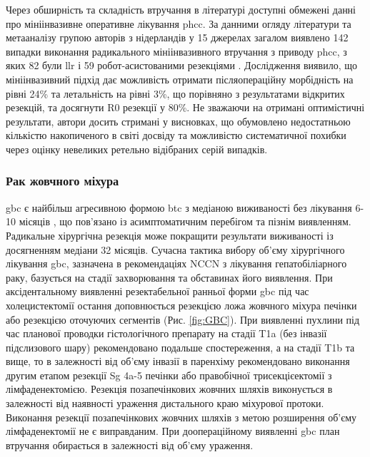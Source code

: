 \begin{refsection}
Через обширність та складність втручання в літературі доступні обмежені данні про мініінвазивне оперативне лікування \acrshort{phcc}. За данними огляду літератури та метааналізу групою авторів з нідерландів у 15 джерелах загалом виявлено 142 випадки виконання радикального мініінвазивного втручання з приводу \acrshort{phcc}, з яких 82 були \acrshort{llr} і 59 робот-асистованими резекціями \cite{Mizuno2019}. Дослідження виявило, що мініінвазивний підхід дає можливість отримати післяопераційну морбідність на рівні 24\% та летальність на рівні 3\%, що порівняно з результатами відкритих резекцій, та досягнути R0 резекції у 80\%. Не зважаючи на отримані оптимістичні результати, автори досить стримані у висновках, що обумовлено недостатньою кількістю накопиченого в світі досвіду та можливістю систематичної похибки через оцінку невеликих ретельно відібраних серій випадків. 

\subsubsection{Рак жовчного міхура}

\acrshort{gbc} є найбільш агресивною формою \acrshort{btc} з медіаною виживаності без лікування 6-10 місяців \cite{Lindner2018}, що пов'язано із асимптоматичним перебігом та пізнім виявленням. Радикальне хірургічна резекція може покращити результати виживаності із досягненням медіани 32 місяців. Сучасна тактика вибору об'єму хірургічного лікування \acrshort{gbc}, зазначена в рекомендаціях \acrshort{NCCN} з лікування гепатобіліарного раку, базується на стадії захворювання та обставинах його виявлення. При аксідентальному виявленні резектабельної ранньої форми \acrshort{gbc} під час холецистектомії остання доповнюється резекцією ложа жовчного міхура печінки або резекцією оточуючих сегментів (Рис. \ref{fig:GBC}). При виявленні пухлини під час планової проводки гістологічного препарату на стадії T1a (без інвазії підслизового шару) рекомендовано подальше спостереження, а на стадії T1b та вище, то в залежності від об'єму інвазії в паренхіму рекомендовано виконання другим етапом резекції Sg 4a-5 печінки або правобічної трисекцієектомії з лімфаденектомією. Резекція позапечінкових жовчних шляхів виконується в залежності від наявності ураження дистального краю міхурової протоки. Виконання резекції позапечінкових жовчних шляхів з метою розширення об'єму лімфаденектомії не є виправданим.  При доопераційному виявленні \acrshort{gbc} план втручання обирається в залежності від об'єму ураження.


\end{refsection}

